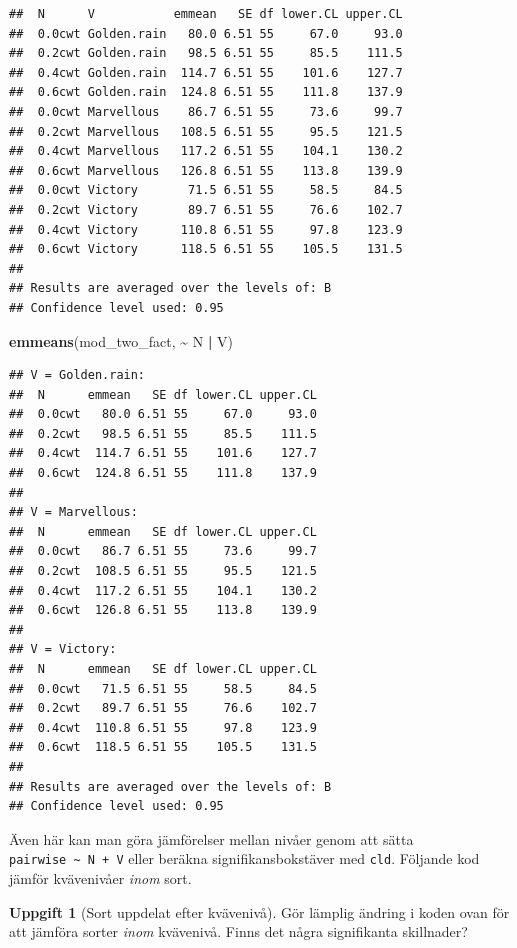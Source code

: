\documentclass[
]{book}
\newenvironment{Shaded}{\begin{snugshade}}{\end{snugshade}}
\newcommand{\FunctionTok}[1]{\textcolor[rgb]{0.13,0.29,0.53}{\textbf{#1}}}
\newcommand{\NormalTok}[1]{#1}
\newcommand{\SpecialCharTok}[1]{\textcolor[rgb]{0.81,0.36,0.00}{\textbf{#1}}}
\theoremstyle{definition}
\theoremstyle{definition}
\theoremstyle{definition}
\newtheorem{exercise}{Uppgift}[chapter]
\theoremstyle{definition}
\theoremstyle{remark}
\begin{document}
\begin{verbatim}
##  N      V           emmean   SE df lower.CL upper.CL
##  0.0cwt Golden.rain   80.0 6.51 55     67.0     93.0
##  0.2cwt Golden.rain   98.5 6.51 55     85.5    111.5
##  0.4cwt Golden.rain  114.7 6.51 55    101.6    127.7
##  0.6cwt Golden.rain  124.8 6.51 55    111.8    137.9
##  0.0cwt Marvellous    86.7 6.51 55     73.6     99.7
##  0.2cwt Marvellous   108.5 6.51 55     95.5    121.5
##  0.4cwt Marvellous   117.2 6.51 55    104.1    130.2
##  0.6cwt Marvellous   126.8 6.51 55    113.8    139.9
##  0.0cwt Victory       71.5 6.51 55     58.5     84.5
##  0.2cwt Victory       89.7 6.51 55     76.6    102.7
##  0.4cwt Victory      110.8 6.51 55     97.8    123.9
##  0.6cwt Victory      118.5 6.51 55    105.5    131.5
## 
## Results are averaged over the levels of: B 
## Confidence level used: 0.95
\end{verbatim}

\begin{Shaded}
\begin{Highlighting}[]
\FunctionTok{emmeans}\NormalTok{(mod\_two\_fact, }\SpecialCharTok{\textasciitilde{}}\NormalTok{ N }\SpecialCharTok{|}\NormalTok{ V)}
\end{Highlighting}
\end{Shaded}

\begin{verbatim}
## V = Golden.rain:
##  N      emmean   SE df lower.CL upper.CL
##  0.0cwt   80.0 6.51 55     67.0     93.0
##  0.2cwt   98.5 6.51 55     85.5    111.5
##  0.4cwt  114.7 6.51 55    101.6    127.7
##  0.6cwt  124.8 6.51 55    111.8    137.9
## 
## V = Marvellous:
##  N      emmean   SE df lower.CL upper.CL
##  0.0cwt   86.7 6.51 55     73.6     99.7
##  0.2cwt  108.5 6.51 55     95.5    121.5
##  0.4cwt  117.2 6.51 55    104.1    130.2
##  0.6cwt  126.8 6.51 55    113.8    139.9
## 
## V = Victory:
##  N      emmean   SE df lower.CL upper.CL
##  0.0cwt   71.5 6.51 55     58.5     84.5
##  0.2cwt   89.7 6.51 55     76.6    102.7
##  0.4cwt  110.8 6.51 55     97.8    123.9
##  0.6cwt  118.5 6.51 55    105.5    131.5
## 
## Results are averaged over the levels of: B 
## Confidence level used: 0.95
\end{verbatim}

Även här kan man göra jämförelser mellan nivåer genom att sätta \texttt{pairwise\ \textasciitilde{}\ N\ +\ V} eller beräkna signifikansbokstäver med \texttt{cld}. Följande kod jämför kvävenivåer \emph{inom} sort.

\begin{exercise}[Sort uppdelat efter kvävenivå]
Gör lämplig ändring i koden ovan för att jämföra sorter \emph{inom} kvävenivå. Finns det några signifikanta skillnader?
\end{exercise}
\end{document}
